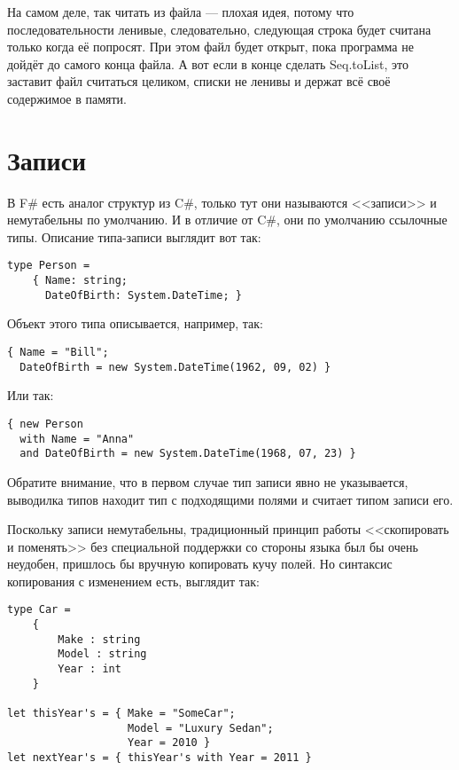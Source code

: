 \documentclass{../../text-style}
\begin{document}
На самом деле, так читать из файла --- плохая идея, потому что последовательности ленивые, следовательно, следующая строка будет считана только когда её попросят. При этом файл будет открыт, пока программа не дойдёт до самого конца файла. А вот если в конце сделать Seq.toList, это заставит файл считаться целиком, списки не ленивы и держат всё своё содержимое в памяти.

\section{Записи}

В F\# есть аналог структур из C\#, только тут они называются <<записи>> и немутабельны по умолчанию. И в отличие от C\#, они по умолчанию ссылочные типы. Описание типа-записи выглядит вот так:

\begin{verbatim}
type Person =
    { Name: string;
      DateOfBirth: System.DateTime; }
\end{verbatim}

Объект этого типа описывается, например, так:

\begin{verbatim}
{ Name = "Bill"; 
  DateOfBirth = new System.DateTime(1962, 09, 02) }
\end{verbatim}

Или так:

\begin{verbatim}
{ new Person
  with Name = "Anna"
  and DateOfBirth = new System.DateTime(1968, 07, 23) }
\end{verbatim}

Обратите внимание, что в первом случае тип записи явно не указывается, выводилка типов находит тип с подходящими полями и считает типом записи его.

Поскольку записи немутабельны, традиционный принцип работы <<скопировать и поменять>> без специальной поддержки со стороны языка был бы очень неудобен, пришлось бы вручную копировать кучу полей. Но синтаксис копирования с изменением есть, выглядит так:

\begin{verbatim}
type Car =
    {
        Make : string
        Model : string
        Year : int
    }

let thisYear's = { Make = "SomeCar"; 
                   Model = "Luxury Sedan"; 
                   Year = 2010 }
let nextYear's = { thisYear's with Year = 2011 }
\end{verbatim}
\end{document}
